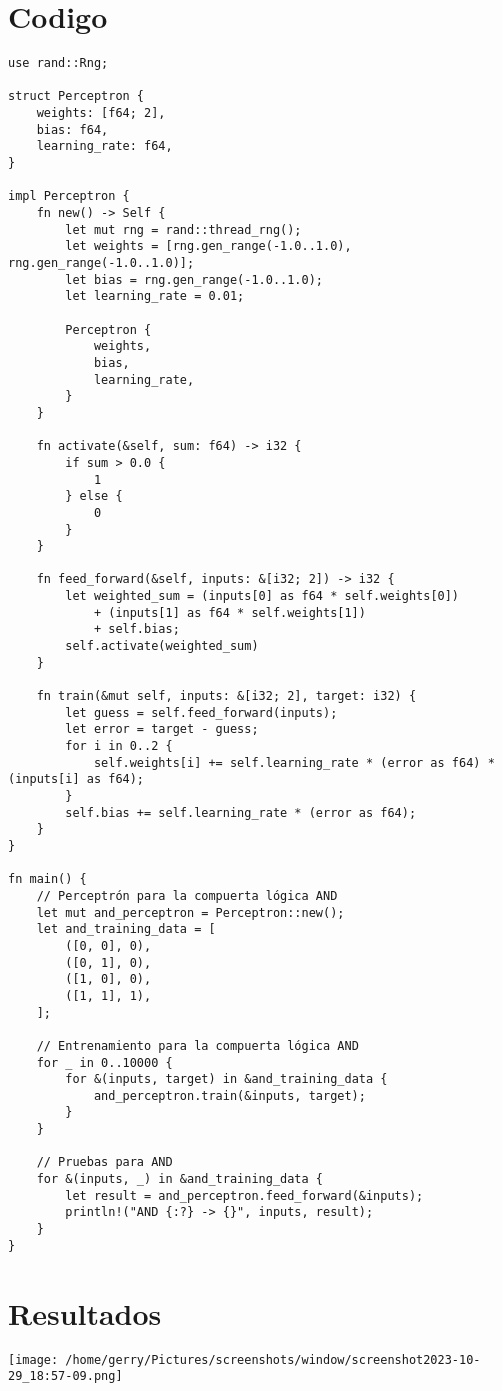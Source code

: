 \documentclass{article}
\begin{document}
\section{Codigo}
\begin{verbatim}
use rand::Rng;

struct Perceptron {
    weights: [f64; 2],
    bias: f64,
    learning_rate: f64,
}

impl Perceptron {
    fn new() -> Self {
        let mut rng = rand::thread_rng();
        let weights = [rng.gen_range(-1.0..1.0), rng.gen_range(-1.0..1.0)];
        let bias = rng.gen_range(-1.0..1.0);
        let learning_rate = 0.01;

        Perceptron {
            weights,
            bias,
            learning_rate,
        }
    }

    fn activate(&self, sum: f64) -> i32 {
        if sum > 0.0 {
            1
        } else {
            0
        }
    }

    fn feed_forward(&self, inputs: &[i32; 2]) -> i32 {
        let weighted_sum = (inputs[0] as f64 * self.weights[0])
            + (inputs[1] as f64 * self.weights[1])
            + self.bias;
        self.activate(weighted_sum)
    }

    fn train(&mut self, inputs: &[i32; 2], target: i32) {
        let guess = self.feed_forward(inputs);
        let error = target - guess;
        for i in 0..2 {
            self.weights[i] += self.learning_rate * (error as f64) * (inputs[i] as f64);
        }
        self.bias += self.learning_rate * (error as f64);
    }
}

fn main() {
    // Perceptrón para la compuerta lógica AND
    let mut and_perceptron = Perceptron::new();
    let and_training_data = [
        ([0, 0], 0),
        ([0, 1], 0),
        ([1, 0], 0),
        ([1, 1], 1),
    ];

    // Entrenamiento para la compuerta lógica AND
    for _ in 0..10000 {
        for &(inputs, target) in &and_training_data {
            and_perceptron.train(&inputs, target);
        }
    }

    // Pruebas para AND
    for &(inputs, _) in &and_training_data {
        let result = and_perceptron.feed_forward(&inputs);
        println!("AND {:?} -> {}", inputs, result);
    }
}
\end{verbatim}
\section{Resultados}
\begin{center}
    \texttt{[image: /home/gerry/Pictures/screenshots/window/screenshot2023-10-29\_18:57-09.png]}
\end{center}
\end{document}
